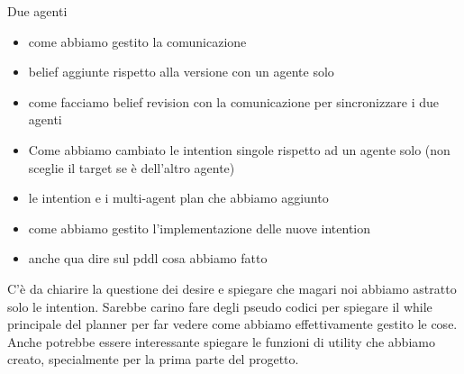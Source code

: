 \documentclass[a4paper, 11pt]{article}
\begin{document}
Due agenti
\begin{itemize}
\item come abbiamo gestito la comunicazione
\item belief aggiunte rispetto alla versione con un agente solo
\item come facciamo belief revision con la comunicazione per sincronizzare i due agenti
\item Come abbiamo cambiato le intention singole rispetto ad un agente solo (non sceglie il target se è dell'altro agente)
\item le intention e i multi-agent plan che abbiamo aggiunto
\item come abbiamo gestito l'implementazione delle nuove intention
\item anche qua dire sul pddl cosa abbiamo fatto
\end{itemize}

C'è da chiarire la questione dei desire e spiegare che magari noi abbiamo astratto solo le intention. Sarebbe carino fare degli pseudo codici per spiegare il while principale del planner per far vedere come abbiamo effettivamente gestito le cose. Anche potrebbe essere interessante spiegare le funzioni di utility che abbiamo creato, specialmente per la prima parte del progetto.





\pagebreak


\end{document}
